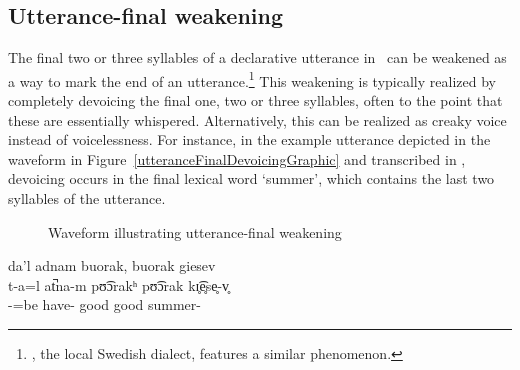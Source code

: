 \subsection{Utterance-final weakening}\label{utteranceFinalDevoicing}
The final two or three syllables of a declarative utterance in \PS\ can be weakened as a way to mark the end of an utterance.\footnote{, the local Swedish dialect, features a similar phenomenon.} 
This weakening is typically realized by completely devoicing the final one, two or three syllables, often to the point that these are essentially whispered. Alternatively, this can be realized as creaky voice instead of voicelessness. For instance, in the example utterance depicted in the waveform in Figure~\vref{utteranceFinalDevoicingGraphic} and transcribed in , devoicing occurs in the final lexical word  ‘summer’, which contains the last two syllables of the utterance. 
\begin{figure}[htb]
\caption{Waveform illustrating utterance-final weakening}\label{utteranceFinalDevoicingGraphic}
\end{figure}
\ea\label{utteranceFinalDevoicing1}%
\glll	da’l adnam buorak, buorak giesev\\
	t-a=l at̚na-m pʊ͡ɔrakʰ pʊ͡ɔrak k{ɪ̥͡e̥se̥-v̥}\\
	-=be\BS{} have- good good summer-\\\nopagebreak
{} 
\z

